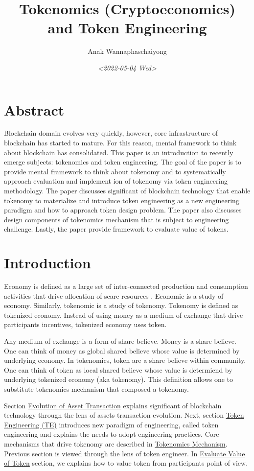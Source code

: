 \documentclass{IEEEtran}
\author{Anak Wannaphaschaiyong}
\date{\textit{<2022-05-04 Wed>}}
\title{Tokenomics (Cryptoeconomics) and Token Engineering}
\begin{document}
\maketitle

\section{Abstract}
\label{sec:org8ff2ff4}
Blockchain domain evolves very quickly, however, core infrastructure of blockchain has started to mature. For this reason, mental framework to think about blockchain has consolidated. This paper is an introduction to recently emerge subjects: tokenomics and token engineering. The goal of the paper is to provide mental framework to think about tokenomy and to systematically approach evaluation and implement ion of tokenomy via token engineering methodology. The paper discusses significant of blockchain technology that enable tokenomy to materialize and introduce token engineering as a new engineering paradigm and how to approach token design problem. The paper also discusses design components of tokenomics mechanism that is subject to engineering challenge. Lastly, the paper provide framework to evaluate value of tokens.
\section{Introduction}
\label{sec:orgd044103}
Economy is defined as a large set of inter-connected production and consumption activities that drive allocation of scare resources \cite{sowell2014basic}. Economic is a study of economy. Similarly, tokenomic is a study of tokenomy. Tokenomy is defined as tokenized economy. Instead of using money as a medium of exchange that drive participants incentives, tokenized economy uses token.

Any medium of exchange is a form of share believe. Money is a share believe. One can think of money as global shared believe whose value is determined by underlying economy. In tokenomics, token are a share believe within community. One can think of token as local shared believe whose value is determiend by underlying tokenized economy (aka tokenomy). This definition allows one to substitute tokenomics mechanism that composed a tokenomy.

Section \hyperref[sec:org90cbe65]{Evolution of Asset Transaction} explains significant of blockchain technology through the lens of assets transaction evolution. Next, section \hyperref[sec:org77c274b]{Token Engineering (TE)} introduces new paradigm of engineering, called token engineering and explains the needs to adopt engineering practices. Core mechanisms that drive tokenomy are described in \hyperref[sec:org4f1198a]{Tokenomics Mechanism}. Previous section is viewed through the lens of token engineer. In \hyperref[sec:org3c77116]{Evaluate Value of Token} section, we explains how to value token from participants point of view.
\end{document}
